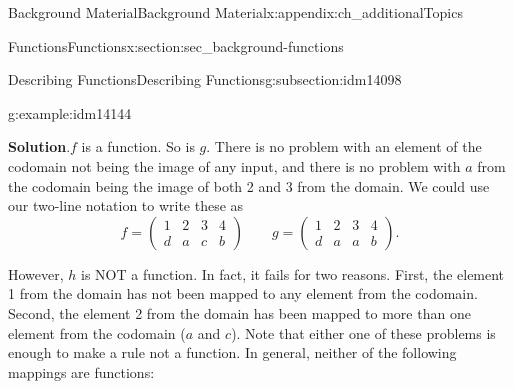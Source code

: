\documentclass[oneside,10pt,]{book}
\numberwithin{equation}{chapter}
\newcommand{\amp}{&}
\begin{document}
\begin{appendixptx}{Background Material}{}{Background Material}{}{}{x:appendix:ch_additionalTopics}
\begin{sectionptx}{Functions}{}{Functions}{}{}{x:section:sec_background-functions}
\begin{subsectionptx}{Describing Functions}{}{Describing Functions}{}{}{g:subsection:idm14098}
\begin{example}{}{g:example:idm14144}
\begin{sidebyside}{3}{0.0416666666666667}{0.0416666666666667}{0.0833333333333333}
\begin{sbspanel}{0.25}
{}%
\end{sbspanel}%
\end{sidebyside}%
\par\smallskip%
\noindent\textbf{Solution}.\hypertarget{g:solution:idm14156}{}\quad{}\(f\) is a function. So is \(g\). There is no problem with an element of the codomain not being the image of any input, and there is no problem with \(a\) from the codomain being the image of both 2 and 3 from the domain. We could use our two-line notation to write these as%
\begin{equation*}
f= \begin{pmatrix} 1 \amp 2 \amp 3 \amp 4 \\ d \amp a \amp c \amp b \end{pmatrix} \qquad g = \begin{pmatrix} 1 \amp 2 \amp 3 \amp 4 \\ d \amp a \amp a \amp b \end{pmatrix}.
\end{equation*}
%
\par
However, \(h\) is NOT a function. In fact, it fails for two reasons. First, the element 1 from the domain has not been mapped to any element from the codomain. Second, the element 2 from the domain has been mapped to more than one element from the codomain (\(a\) and \(c\)). Note that either one of these problems is enough to make a rule not a function. In general, neither of the following mappings are functions:%
\begin{sidebyside}{2}{0.1375}{0.1375}{0.275}%
\begin{sbspanel}{0.18}%
%
\end{sbspanel}%
\begin{sbspanel}{0.27}%
\end{sbspanel}
\end{sidebyside}
\end{example}
\end{subsectionptx}
\end{sectionptx}
\end{appendixptx}
\end{document}
